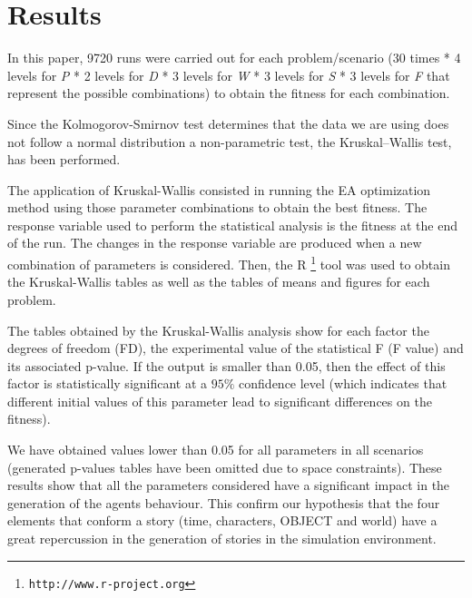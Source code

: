 \documentclass[runningheads,a4paper]{llncs}
\begin{document}

\section{Results}
\label{sec:res}

In this paper, 9720 runs were carried out for each problem/scenario (30 times * 4 levels for \emph{P} * 2 levels for \emph{D} * 3 levels for \emph{W} * 3 levels for \emph{S} * 3 levels for \emph{F} that represent the possible combinations) to obtain the fitness for each combination.

Since the Kolmogorov-Smirnov test determines that the data we are using
does not follow a normal distribution a non-parametric test, the Kruskal–Wallis test, has been
performed.  %

The application of Kruskal-Wallis consisted in running the EA optimization method using those parameter combinations to obtain the best fitness. 
The response variable used to perform the statistical analysis is the fitness at the end of the run. The changes in the response variable are produced when a new combination of parameters is considered. Then, the {R} \footnote{{\tt http://www.r-project.org}} tool was used to obtain the Kruskal-Wallis tables as well as the tables of means and figures for each problem.

The tables obtained by the Kruskal-Wallis analysis show for each factor the  degrees of freedom (FD), the experimental value of the statistical F (F value) and its associated p-value. If the output is smaller than 0.05, then the
effect of this factor is statistically significant at a $95\%$
confidence level (which indicates that different initial values of
this parameter lead to significant differences on the fitness).

We have obtained values lower than 0.05 for all parameters in all scenarios (generated p-values tables have been omitted due to space constraints). These results show that all the parameters considered have a significant
impact in the generation of the agents behaviour. This confirm our hypothesis that the four elements that conform a story (time, characters, OBJECT and world) have a great repercussion in the generation of stories in the simulation environment.
\end{document}
